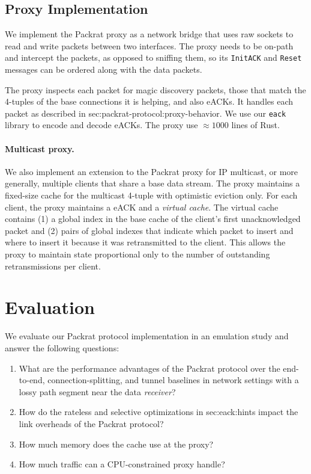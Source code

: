 \subsection{Proxy Implementation}

We implement the Packrat proxy as a network bridge that uses raw sockets to read
and write packets between two interfaces. The proxy needs to
be on-path and intercept the packets, as opposed to sniffing them, so
its \texttt{InitACK} and \texttt{Reset} messages can be ordered along with the
data packets.

The proxy inspects each packet for magic discovery packets, those that match the
4-tuples of the base connections it is helping, and also eACKs.
It handles each packet as described in \Cref
{sec:packrat-protocol:proxy-behavior}. We use our \texttt{eack} library to
encode and decode eACKs. The proxy use $\approx\!1000$ lines of Rust.

\paragraph{Multicast proxy.}

We also implement an extension to the Packrat proxy for IP multicast, or more
generally, multiple clients that share a base data stream. The proxy maintains
a fixed-size cache for the multicast 4-tuple with optimistic eviction only. For
each client, the proxy maintains a eACK and a \textit{virtual cache}. The
virtual cache contains (1) a global index in the base cache of the client's
first unacknowledged packet and (2) pairs of global indexes that indicate which
packet to insert and where to insert it because it was retransmitted to the
client. This allows the proxy to maintain state proportional only to the number
of outstanding retransmissions per client.

\section{Evaluation}

We evaluate our Packrat protocol implementation in an emulation study and answer
the following questions:
\vspace{-0.2cm}
\begin{enumerate}[noitemsep]
    \item What are the performance advantages of the Packrat protocol over the
     end-to-end, connection-splitting, and tunnel baselines in network settings
     with a lossy path segment near the data \textit{receiver}?
    \item How do the rateless and selective optimizations in \Cref
     {sec:eack:hints} impact the link overheads of the Packrat protocol?
    \item How much memory does the cache use at the proxy?
    \item How much traffic can a CPU-constrained proxy handle?
\end{enumerate}

